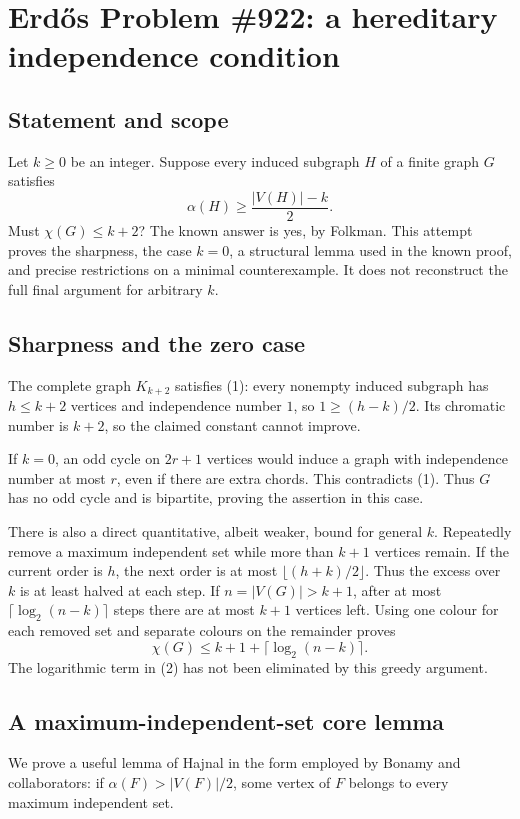 \section*{Erd\H{o}s Problem \#922: a hereditary independence condition}
\subsection*{Statement and scope}
Let \(k\geq0\) be an integer. Suppose every induced subgraph \(H\) of a finite graph \(G\) satisfies
\[
 \alpha(H)\geq \frac{|V(H)|-k}{2}. \tag{1}
\]
Must \(\chi(G)\leq k+2\)?
The known answer is yes, by Folkman. This attempt proves the sharpness, the case \(k=0\), a structural lemma used in the known proof, and precise restrictions on a minimal counterexample. It does not reconstruct the full final argument for arbitrary \(k\).

\subsection*{Sharpness and the zero case}
The complete graph \(K_{k+2}\) satisfies (1): every nonempty induced subgraph has \(h\leq k+2\) vertices and independence number \(1\), so \(1\geq(h-k)/2\). Its chromatic number is \(k+2\), so the claimed constant cannot improve.

If \(k=0\), an odd cycle on \(2r+1\) vertices would induce a graph with independence number at most \(r\), even if there are extra chords. This contradicts (1). Thus \(G\) has no odd cycle and is bipartite, proving the assertion in this case.

There is also a direct quantitative, albeit weaker, bound for general \(k\).
Repeatedly remove a maximum independent set while more than \(k+1\) vertices remain. If the current order is \(h\), the next order is at most \(\lfloor(h+k)/2\rfloor\). Thus the excess over \(k\) is at least halved at each step. If \(n=|V(G)|>k+1\), after at most
\(\lceil\log_2(n-k)\rceil\) steps there are at most \(k+1\) vertices left. Using one colour for each removed set and separate colours on the remainder proves
\[
 \chi(G)\leq k+1+\lceil\log_2(n-k)\rceil. \tag{2}
\]
The logarithmic term in (2) has not been eliminated by this greedy argument.

\subsection*{A maximum-independent-set core lemma}
We prove a useful lemma of Hajnal in the form employed by Bonamy and collaborators:
if \(\alpha(F)>|V(F)|/2\), some vertex of \(F\) belongs to every maximum independent set.

